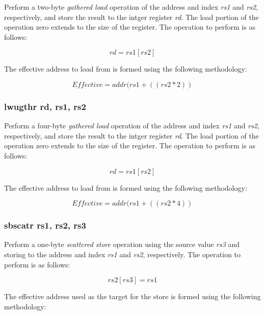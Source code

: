 \documentclass{article}
\begin{document}
Perform a two-byte \emph{gathered load} operation of the address and
index \emph{rs1} and \emph{rs2}, respectively, and store the result
to the intger register \emph{rd}.  The load portion of the operation
zero extends to the size of the register.
The operation to perform is as follows:

\begin{equation}
rd = rs1[rs2]
\end{equation}

The effective address to load
from is formed using the following methodology:

\begin{equation}
Effective = addr(rs1 + ((rs2 * 2))
\end{equation}

\subsubsection{lwugthr rd, rs1, rs2}

Perform a four-byte \emph{gathered load} operation of the address and
index \emph{rs1} and \emph{rs2}, respectively, and store the result
to the intger register \emph{rd}.  The load portion of the operation
zero extends to the size of the register.
The operation to perform is as follows:

\begin{equation}
rd = rs1[rs2]
\end{equation}

The effective address to load
from is formed using the following methodology:

\begin{equation}
Effective = addr(rs1 + ((rs2 * 4))
\end{equation}


\subsubsection{sbscatr rs1, rs2, rs3}

Perform a one-byte \emph{scattered store} operation using the 
source value \emph{rs3} and storing to the address and index
\emph{rs1} and \emph{rs2}, respectively.  The operation to
perform is as follows: 

\begin{equation}
rs2[rs3] = rs1
\end{equation}

The effective address used as the target
for the store is formed using the following methodology:
\end{document}
